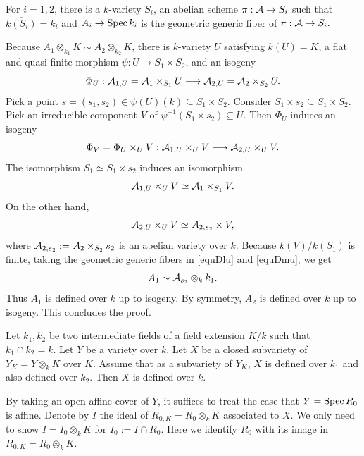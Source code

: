 \documentclass[12pt]{amsart}
\begin{document}
For $i=1,2$, there is a $k$-variety $S_i$, an abelian scheme $\pi:{\mathcal A}\to S_i$ such that $\overline{k(S_i)}=k_i$ and $A_i\to {\rm Spec \,} k_i$ is the geometric generic fiber of $\pi:{\mathcal A}\to S_i.$

Because $A_1\otimes_{k_1}K\sim A_2\otimes_{k_2}K$, there is $k$-variety $U$ satisfying $k(U)=K$, a flat and quasi-finite morphism $\psi: U\to S_1\times S_2$, and an isogeny
$$\Phi_U:{\mathcal A}_{1,U}={\mathcal A}_1\times_{S_1} U\longrightarrow {\mathcal A}_{2,U}={\mathcal A}_2\times_{S_2} U.$$
Pick a point $s=(s_1,s_2)\in \psi(U)(k)\subseteq S_1\times S_2.$ 
Consider $S_1\times s_2 \subseteq S_1\times S_2.$
Pick an irreducible component $V$  of $\psi^{-1}(S_1\times s_2)\subseteq U.$
Then $\Phi_U$ induces an isogeny 
$$\Phi_V=\Phi_U\times_UV: {\mathcal A}_{1,U}\times_UV\longrightarrow {\mathcal A}_{2,U}\times_UV.$$
The isomorphism $S_1\simeq S_1\times s_2$ induces an isomorphism 
\begin{equation}\label{equDlu}{\mathcal A}_{1,U}\times_UV\simeq {\mathcal A}_1\times _{S_1} V.\end{equation}
On the other hand, 
\begin{equation}\label{equDmu}
{\mathcal A}_{2,U}\times_UV\simeq {\mathcal A}_{2,s_2}\times V,\end{equation}
where ${\mathcal A}_{2,s_2}:={\mathcal A}_2\times_{S_2}s_2$ is an abelian variety over $k.$
Because $k(V)/k(S_1)$ is finite, taking the geometric generic fibers in \eqref{equDlu} and  \eqref{equDmu}, we get $$A_1\sim {\mathcal A}_{s_2}\otimes_kk_1.$$
Thus $A_1$ is defined over $k$ up to isogeny.
By symmetry, $A_2$ is defined over $k$ up to isogeny.
This concludes the proof.
\endproof







\medskip


\begin{lem}\label{lemsubvardef}
Let $k_1, k_2$ be two intermediate fields of a field extension $K/k$ such that  $k_1\cap k_2=k$.
Let $Y$ be a variety over $k$. Let $X$ be a closed subvariety of $Y_K=Y\otimes_kK$ over $K$.
Assume that as a subvariety of $Y_K$, $X$ is defined over $k_1$ and also defined over $k_2$.
Then $X$ is defined over $k.$
\end{lem}

\proof
By taking an open affine cover of $Y$, it suffices to treat the case that $Y={\rm Spec \,} R_0$ is affine. Denote by $I$ the ideal of $R_{0,K}=R_0\otimes_kK$ associated to $X$.
We only need to show $I=I_0\otimes_kK$ for $I_0:=I\cap R_0.$ Here we identify $R_0$ with its image in $R_{0,K}=R_0\otimes_kK.$
\end{document}
